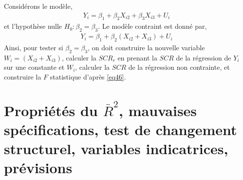 \begin{exemple} Considérons le modèle,
\begin{align*}
Y_i = \beta_1 + \beta_2X_{i2} + \beta_3X_{i3}+U_i
\end{align*}
et l'hypothèse nulle $H_0: \beta_2 = \beta_3$. Le modèle contraint est donné par,
\begin{align*}
Y_i=\beta_1+\beta_2(X_{i2}+X_{i3})+U_i
\end{align*}
Ainsi, pour tester si $\beta_2=\beta_3$, on doit construire la nouvelle variable $W_i = (X_{i2}+X_{i3})$, calculer la $SCR_r$ en prenant la $SCR$ de la régression de $Y_i$ sur une constante et $W_i$, calculer la $SCR$ de la régression non contrainte, et construire la $F$ statistique d'après \eqref{eq46}.
\label{ex2}
\end{exemple}

\newpage

\section{Propriétés du $\bar{R}^2$, mauvaises spécifications, test de changement structurel, variables indicatrices, prévisions}

